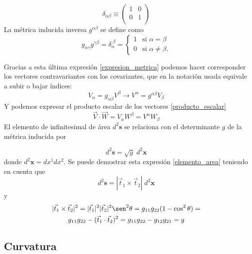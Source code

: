 \begin{equation*}
\delta_{\alpha\beta}\equiv\left(\begin{array}{cc}
1&0\\
0&1\\
\end{array}\right)
\end{equation*}
La métrica inducida inversa $g^{\alpha\beta}$ se define como
\begin{equation}\label{expresion_metrica}
g_{\alpha\gamma}g^{\gamma\beta}=\delta_{\alpha}^{\ \beta}=\begin{cases}
1&\text{si $\alpha=\beta$}\\
0&\text{si $\alpha\neq\beta$}.
\end{cases}
\end{equation}

Gracias a esta última expresión \eqref{expresion_metrica} podemos hacer
corresponder los vectores contravariantes con los covariantes, que en la
notación usada equivale a subir o bajar índices:
\begin{equation*}
V_{\alpha}=g_{\alpha\beta}V^{\beta}\rightarrow V^{\alpha}=g^{\alpha\beta}V_{\beta} 
\end{equation*}
Y podemos expresar el producto escalar de los vectores
\eqref{producto_escalar} 
\begin{equation*}
\vec{V}\cdot\vec{W}=V_{\alpha}W^{\beta}=V^{\alpha}W_{\beta}
\end{equation*}
El elemento de infinitesimal de área $d^2\mathbf{s}$ se relaciona con el
determinante $g$ de la métrica inducida por

\begin{equation}\label{elemento_area}
d^2\mathbf{s}=\sqrt{g}\;d^2\mathbf{x}
\end{equation}
donde $d^2\mathbf{x}=dx^1dx^2$. Se puede demostrar esta expresión
\eqref{elemento_area} teniendo en cuenta que
\begin{equation*}
d^2\mathbf{s}=|\vec{t}_1\times\vec{t}_2|\;d^2\mathbf{x}
\end{equation*}
y
\begin{multline*}
|\vec{t}_1\times\vec{t}_2|^2=|\vec{t}_1|^2|\vec{t}_2|^2\sen^2
\theta=g_{11}g_{22}(1-\cos^2 \theta)=\\
g_{11}g_{22}-(\vec{t}_1\cdot\vec{t}_2)^2=g_{11}g_{22}-g_{12}g_{21}=g
\end{multline*}

\subsection{Curvatura}

